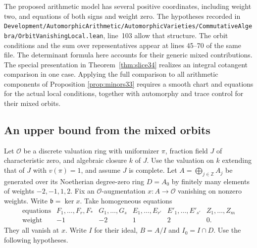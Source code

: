 \documentclass[a4paper,11pt]{article}
\theoremstyle{definition}
\theoremstyle{remark}
\newcommand{\ZZ}{\mathbb Z}\newcommand{\ord}{\operatorname{ord}}
\newcommand{\srcloc}[2]{{\small\nolinkurl{#1.lean}}, line~#2}
\numberwithin{equation}{section}
\newcommand{\OO}{\mathcal O}
\begin{document}
The proposed arithmetic model has several positive coordinates, including weight two, and equations of both signs and weight zero. The hypotheses recorded in \srcloc{Development/AutomorphicArithmetic/AutomorphicVarieties/CommutativeAlgebra/OrbitVanishingLocal}{103} allow that structure. The orbit conditions and the sum over representatives appear at lines 45--70 of the same file. The determinant formula here accounts for their generic mixed contributions. The special presentation in Theorem~\ref{thm:slice34} realizes an integral cotangent comparison in one case. Applying the full comparison to all arithmetic components of Proposition \ref{prop:minors33} requires a smooth chart and equations for the actual local conditions, together with automorphy and trace control for their mixed orbits.

\subsection{An upper bound from the mixed orbits}\label{nav:IV-05}
\label{sec:upper35}

Let \(\OO\) be a discrete valuation ring with uniformizer \(\pi\), fraction field \(J\) of characteristic zero, and algebraic closure \(k\) of \(J\). Use the valuation on \(k\) extending that of \(J\) with \(v(\pi)=1\), and assume \(J\) is complete. Let \(A=\bigoplus_{j\in\ZZ}A_j\) be generated over its Noetherian degree-zero ring \(D=A_0\) by finitely many elements of weights \(-2,-1,1,2\). Fix an \(\OO\)-augmentation \(x:A\to\OO\) vanishing on nonzero weights. Write \(\mathfrak b=\ker x\). Take homogeneous equations
\[
 \begin{array}{c|ccccc}
 \text{equations}&F_1,\ldots,F_r,F_*&G_1,\ldots,G_s&E_1,\ldots,E_{r'}&
                          E'_1,\ldots,E'_{s'}&Z_1,\ldots,Z_m\\
 \text{weight}&-1&-2&1&2&0 .
 \end{array}
\]
They all vanish at \(x\). Write \(I\) for their ideal, \(B=A/I\) and \(I_0=I\cap D\). Use the following hypotheses.
\end{document}
